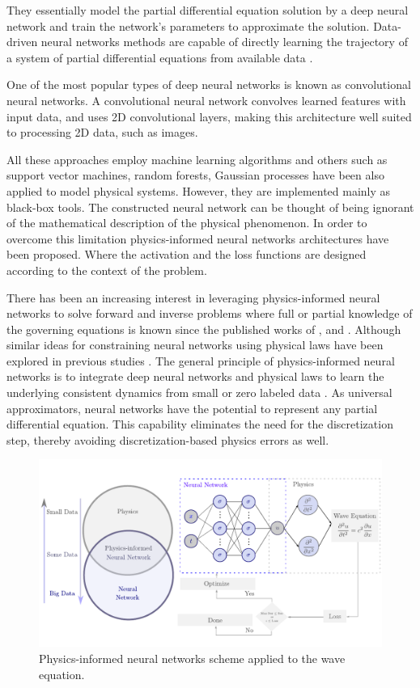 \documentclass[11pt,twoside]{article}
\begin{document}
They essentially model the partial differential equation solution by a deep neural network and train the network’s parameters to approximate 
the solution. Data-driven neural networks methods are capable of directly learning the trajectory of a system of partial differential 
equations from available data \citep{li_neural_2020,li_fourier_2021}.

One of the most popular types of deep neural networks is known as convolutional neural networks. A convolutional neural network convolves 
learned features with input data, and uses 2D convolutional layers, making this architecture well suited to processing 2D data, such as images.

All these approaches employ machine learning algorithms and others such as support vector machines, random forests, Gaussian processes have 
been also applied to model physical systems. However, they are implemented mainly as black-box tools. The constructed neural network can be 
thought of being ignorant of the mathematical description of the physical phenomenon. In order to overcome this limitation physics-informed 
neural networks architectures have been proposed. Where the activation and the loss functions are designed according to the context of the 
problem.

There has been an increasing interest in leveraging physics-informed neural networks to solve forward and inverse problems where full or 
partial knowledge of the governing equations is known since the published works of , 
 and . Although similar ideas for constraining neural networks using 
physical laws have been explored in previous studies \citep{lagaris_artificial_1998}. The general principle of physics-informed neural 
networks is to integrate deep neural networks and physical laws to learn the underlying consistent dynamics from small or zero labeled 
data \citep{karniadakis_physics-informed_2021}. As universal approximators, neural networks have the potential to represent any partial 
differential equation. This capability eliminates the need for the discretization step, thereby avoiding discretization-based physics errors 
as well. 

\begin{figure}[H]
\centering
    \includegraphics[width=1.0\textwidth]{figs/scheme_pinns_waves.pdf}
    \caption{Physics-informed neural networks scheme applied to the wave equation.}
    \label{deep_learning_subset_architecture}
\end{figure}
\end{document}
